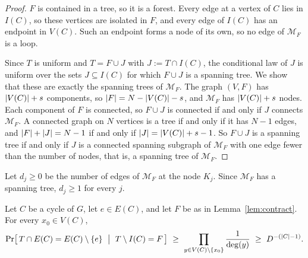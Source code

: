 \begin{proof}
$F$ is contained in a tree, so it is a forest. Every edge at a vertex of $C$ lies in $I(C)$, so these vertices are isolated in $F$, and every edge of $I(C)$ has an endpoint in $V(C)$. Such an endpoint forms a node of its own, so no edge of $\mathcal M_F$ is a loop.

Since $T$ is uniform and $T=F\cup J$ with $J:=T\cap I(C)$, the conditional law of $J$ is uniform over the sets $J\subseteq I(C)$ for which $F\cup J$ is a spanning tree. We show that these are exactly the spanning trees of $\mathcal M_F$. The graph $(V,F)$ has $\lvert V(C)\rvert+s$ components, so $\lvert F\rvert=N-\lvert V(C)\rvert-s$, and $\mathcal M_F$ has $\lvert V(C)\rvert+s$ nodes. Each component of $F$ is connected, so $F\cup J$ is connected if and only if $J$ connects $\mathcal M_F$. A connected graph on $N$ vertices is a tree if and only if it has $N-1$ edges, and $\lvert F\rvert+\lvert J\rvert=N-1$ if and only if $\lvert J\rvert=\lvert V(C)\rvert+s-1$. So $F\cup J$ is a spanning tree if and only if $J$ is a connected spanning subgraph of $\mathcal M_F$ with one edge fewer than the number of nodes, that is, a spanning tree of $\mathcal M_F$.
\end{proof}

Let $d_j\ge0$ be the number of edges of $\mathcal M_F$ at the node $K_j$. Since $\mathcal M_F$ has a spanning tree, $d_j\ge1$ for every $j$.

\begin{lemma}\label{lem:local}
Let $C$ be a cycle of $G$, let $e\in E(C)$, and let $F$ be as in Lemma~\ref{lem:contract}. For every $x_0\in V(C)$,
\[
  \Pr\bigl[\,T\cap E(C)=E(C)\setminus\{e\}\ \bigm|\ T\setminus I(C)=F\,\bigr]\ \ge\ \prod_{y\in V(C)\setminus\{x_0\}}\frac1{\deg(y)}\ \ge\ D^{-(\abs C-1)} .
\]
\end{lemma}

